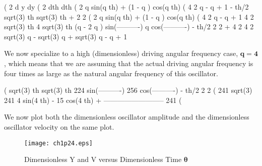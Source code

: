 \documentclass[11pt]{article}
\begin{document}
\begin{myVerbatim}
(%
                           2
                          d y    dy
(%
                             2   dth
                          dth
(%
                              2
          q sin(q th) + (1 - q ) cos(q th)
(%
                     4    2
                    q  - q  + 1
                             - th/2          sqrt(3) th            sqrt(3) th
                         + %
                                                 2                     2
(%
                              2
          q sin(q th) + (1 - q ) cos(q th)
(%
                     4    2
                    q  - q  + 1
                             4      2      sqrt(3) th        4     sqrt(3) th
                           (q  - 2 q ) sin(----------)      q  cos(----------)
                - th/2                         2                       2
            + %
                                 4            2                 4    2
                        sqrt(3) q  - sqrt(3) q  + sqrt(3)      q  - q  + 1
\end{myVerbatim}
\newpage
\noindent We now specialize to a high (dimensionless) driving angular frequency case,
  $\mathbf{q = 4}$, which means that we are assuming that the actual driving
  angular frequency is four times as large as the natural angular frequency of this oscillator.
\begin{myVerbatim}
(%
                        sqrt(3) th            sqrt(3) th
                224 sin(----------)   256 cos(----------)
        - th/2              2                     2
(%
                    241 sqrt(3)               241
                                                     4 sin(4 th) - 15 cos(4 th)
                                                   + --------------------------
                                                                241
(%
\end{myVerbatim}
We now plot both the dimensionless oscillator amplitude and the dimensionless oscillator
  velocity on the same plot.
\smallskip
\begin{figure} [h]  
   \centerline{\texttt{[image: ch1p24.eps]} }
	\caption{Dimensionless Y and V versus Dimensionless Time $\boldsymbol{\theta}$}
\end{figure}
\end{document}
